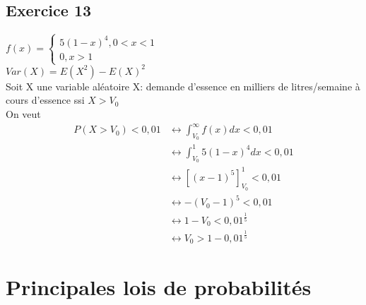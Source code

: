 \documentclass[12pt]{report}
\begin{document}
\section{ Exercice 13}
$f(x) = \begin{cases}
    5 (1-x)^4 , 0<x<1\\
    0,x>1
\end{cases}$\\
$Var(X) = E(X^2) - E(X)^2$\\
Soit X une variable aléatoire
X: demande d'essence en milliers de litres/semaine à cours d'essence ssi $X>V_0$\\
On veut 
\begin{align*}
    P(X> V_0) < 0,01 & \leftrightarrow \int_{V_0}^{\infty} f(x)dx < 0,01\\
    & \leftrightarrow \int_{V_0}^1 5(1-x)^4 dx < 0,01\\
    & \leftrightarrow [(x-1)^5]^1_{V_0} < 0,01\\
    & \leftrightarrow - (V_0 -1)^5 < 0,01\\
    & \leftrightarrow 1-V_0 < 0,01^{\frac{1}{5}}\\
    & \leftrightarrow  V_0 >  1- 0,01^{\frac{1}{5}}
\end{align*}

\chapter{Principales lois de probabilités}
\end{document}

